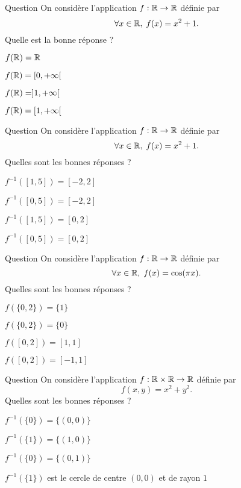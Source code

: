 \begin{multi}[multiple,feedback=
{Pour tout \(x\in \Rr\), \(f(x)\geq 1\). Donc \(f(\Rr)\subset [1,+\infty[\). Réciproquement, tout \(y\in [1,\infty [\) admet un antécédent. Donc \([1,+\infty[ \subset f(\Rr)\).
}]{Question}
On considère l'application \(f:\mathbb{R}\to \mathbb{R}\) définie par
\[\forall x\in \mathbb{R},\; f(x)=x^2+1.\]
Quelle est la bonne réponse ?

    \item \(f(\mathbb{R})=\mathbb{R}\)
    \item \(f(\mathbb{R})=[0,+\infty [\)
    \item \(f(\mathbb{R})=]1,+\infty [\)
    \item* \(f(\mathbb{R})=[1,+\infty [\)
\end{multi}


\begin{multi}[multiple,feedback=
{D'une part, \(x\in f^{-1}([1,5])\Leftrightarrow f(x)\in [1,5]\Leftrightarrow x^2\leq 4\). D'autre part, \(x\in f^{-1}([0,5])\Leftrightarrow f(x)\in [0,5]\Leftrightarrow x^2\leq 4\). Donc \(f^{-1}([1,5])=f^{-1}([0,5])=[-2,2]\).
}]{Question}
On considère l'application \(f:\mathbb{R}\to \mathbb{R}\) définie par
\[\forall x\in \mathbb{R},\; f(x)=x^2+1.\]
Quelles sont les bonnes réponses ?

    \item* \(f^{-1}([1,5])=[-2,2]\)
    \item* \(f^{-1}([0,5])=[-2,2]\)
    \item \(f^{-1}([1,5])=[0,2]\)
    \item \(f^{-1}([0,5])=[0,2]\)
\end{multi}


\begin{multi}[multiple,feedback=
{D'abord, \(f(0)=f(2)=1\). Mais, \(f\) est décroissante sur \([0,1]\) et est croissante sur \([1,2]\) avec \(f(1)=-1\). Dessiner le graphe de \(f\) !
}]{Question}
On considère l'application \(f:\mathbb{R}\to \mathbb{R}\) définie par
\[\forall x\in \mathbb{R},\; f(x)=\cos (\pi x).\]
Quelles sont les bonnes réponses ?

    \item* \(f(\{0,2\})=\{1\}\)
    \item \(f(\{0,2\})=\{0\}\)
    \item \(f([0,2])=[1,1]\)
    \item* \(f([0,2])=[-1,1]\)
\end{multi}


\begin{multi}[multiple,feedback=
{D'abord, \(x^2+y^2=0\Leftrightarrow (x,y)=(0,0)\). Par ailleurs, l'ensemble des solutions \((x,y)\) de \(x^2+y^2=1\) est le cercle de centre \((0,0)\) et de rayon \(1\).
}]{Question}
On considère l'application \(f:\mathbb{R}\times \mathbb{R}\to \mathbb{R}\) définie par
\[f(x,y)=x^2+y^2.\]
Quelles sont les bonnes réponses ?

    \item* \(f^{-1}(\{0\})=\{(0,0)\}\)
    \item \(f^{-1}(\{1\})=\{(1,0)\}\)
    \item \(f^{-1}(\{0\})=\{(0,1)\}\)
    \item* \(f^{-1}(\{1\})\) est le cercle de centre \((0,0)\) et de rayon \(1\)
\end{multi}


